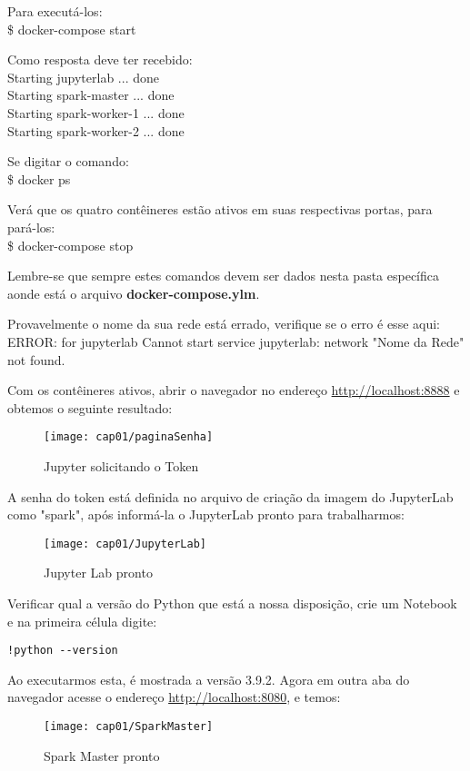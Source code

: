 Para executá-los: \\
{\ttfamily\$ docker-compose start}

Como resposta deve ter recebido: \\
{\ttfamily Starting jupyterlab     ... done \\
Starting spark-master   ... done \\
Starting spark-worker-1 ... done \\
Starting spark-worker-2 ... done}

Se digitar o comando: \\
{\ttfamily\$ docker ps}

Verá que os quatro contêineres estão ativos em suas respectivas portas, para pará-los: \\
{\ttfamily\$ docker-compose stop}

Lembre-se que sempre estes comandos devem ser dados nesta pasta específica aonde está o arquivo \textbf{docker-compose.ylm}.

\begin{note} 
	Provavelmente o nome da sua rede está errado, verifique se o erro é esse aqui: ERROR: for jupyterlab  Cannot start service jupyterlab: network "Nome da Rede" not found.
\end{note}
 
Com os contêineres ativos, abrir o navegador no endereço \url{http://localhost:8888} e obtemos o seguinte resultado:
\begin{figure}[H]
	\centering\texttt{[image: cap01/paginaSenha]}
	\caption{Jupyter solicitando o Token}
\end{figure}

A senha do token está definida no arquivo de criação da imagem do JupyterLab como "spark", após informá-la o JupyterLab pronto para trabalharmos:
\begin{figure}[H]
	\centering\texttt{[image: cap01/JupyterLab]}
	\caption{Jupyter Lab pronto}
\end{figure}

Verificar qual a versão do Python que está a nossa disposição, crie um Notebook e na primeira célula digite:
\begin{lstlisting}[]
!python --version
\end{lstlisting}

Ao executarmos esta, é mostrada a versão 3.9.2. Agora em outra aba do navegador acesse o endereço \url{http://localhost:8080}, e temos:
\begin{figure}[H]
	\centering\texttt{[image: cap01/SparkMaster]}
	\caption{Spark Master pronto}
\end{figure}

